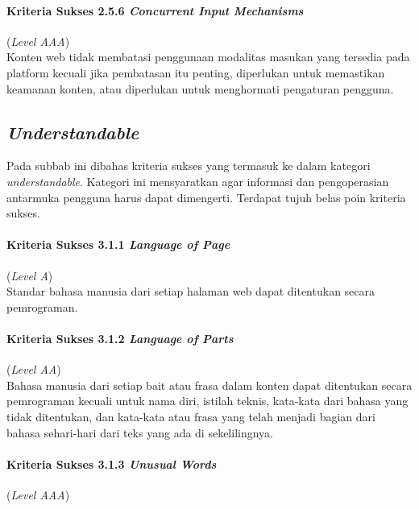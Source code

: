 \paragraph{Kriteria Sukses 2.5.6 \textit{Concurrent Input Mechanisms}}
\label{subsec:kriteria_2.5.6}
(\textit{Level AAA}) \\

Konten web tidak membatasi penggunaan modalitas masukan yang tersedia pada platform kecuali jika pembatasan itu penting, diperlukan untuk memastikan keamanan konten, atau diperlukan untuk menghormati pengaturan pengguna.

\subsection{\textit{Understandable}}
\label{subsec:kriteria_understandable}

Pada subbab ini dibahas kriteria sukses yang termasuk ke dalam kategori \textit{understandable}. Kategori ini mensyaratkan agar informasi dan pengoperasian antarmuka pengguna harus dapat dimengerti. Terdapat tujuh belas poin kriteria sukses.

\paragraph{Kriteria Sukses 3.1.1 \textit{Language of Page}}
\label{subsec:kriteria_3.1.1}
(\textit{Level A}) \\

Standar bahasa manusia dari setiap halaman web dapat ditentukan secara pemrograman.

\paragraph{Kriteria Sukses 3.1.2 \textit{Language of Parts}}
\label{subsec:kriteria_3.1.2}
(\textit{Level AA}) \\

Bahasa manusia dari setiap bait atau frasa dalam konten dapat ditentukan secara pemrograman kecuali untuk nama diri, istilah teknis, kata-kata dari bahasa yang tidak ditentukan, dan kata-kata atau frasa yang telah menjadi bagian dari bahasa sehari-hari dari teks yang ada di sekelilingnya.

\paragraph{Kriteria Sukses 3.1.3 \textit{Unusual Words}}
\label{subsec:kriteria_3.1.3}
(\textit{Level AAA}) \\

